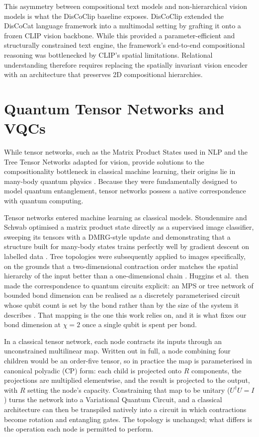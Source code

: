 \documentclass[12pt, a4paper, oneside]{report}
\begin{document}
This asymmetry between compositional text models and non-hierarchical vision models is what the DisCoClip baseline \cite{discoclip} exposes. DisCoClip extended the DisCoCat language framework into a multimodal setting by grafting it onto a frozen CLIP vision backbone. While this provided a parameter-efficient and structurally constrained text engine, the framework's end-to-end compositional reasoning was bottlenecked by CLIP's spatial limitations. Relational understanding therefore requires replacing the spatially invariant vision encoder with an architecture that preserves 2D compositional hierarchies.

\section{Quantum Tensor Networks and VQCs}

While tensor networks, such as the Matrix Product States used in NLP and the Tree Tensor Networks adapted for vision, provide solutions to the compositionality bottleneck in classical machine learning, their origins lie in many-body quantum physics \cite{mps_physics}. Because they were fundamentally designed to model quantum entanglement, tensor networks possess a native correspondence with quantum computing.

Tensor networks entered machine learning as classical models. Stoudenmire and Schwab optimised a matrix product state directly as a supervised image classifier, sweeping its tensors with a DMRG-style update and demonstrating that a structure built for many-body states trains perfectly well by gradient descent on labelled data \cite{stoudenmire2016}. Tree topologies were subsequently applied to images specifically, on the grounds that a two-dimensional contraction order matches the spatial hierarchy of the input better than a one-dimensional chain \cite{ttn_images}. Huggins et al.\ then made the correspondence to quantum circuits explicit: an MPS or tree network of bounded bond dimension can be realised as a discretely parameterised circuit whose qubit count is set by the bond rather than by the size of the system it describes \cite{huggins2019tn}. That mapping is the one this work relies on, and it is what fixes our bond dimension at $\chi = 2$ once a single qubit is spent per bond.

In a classical tensor network, each node contracts its inputs through an unconstrained multilinear map. Written out in full, a node combining four children would be an order-five tensor, so in practice the map is parameterised in canonical polyadic (CP) form: each child is projected onto $R$ components, the projections are multiplied elementwise, and the result is projected to the output, with $R$ setting the node's capacity. Constraining that map to be unitary ($U^{\dagger}U = I$) turns the network into a Variational Quantum Circuit, and a classical architecture can then be transpiled natively into a circuit in which contractions become rotation and entangling gates. The topology is unchanged; what differs is the operation each node is permitted to perform.
\end{document}
